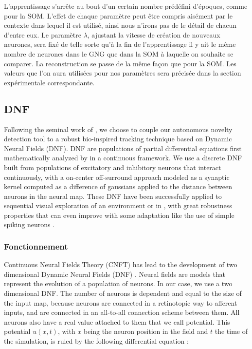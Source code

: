 	L'apprentissage s'arrête au bout d'un certain nombre prédéfini d'époques, comme pour la SOM. L'effet de chaque paramètre peut être compris aisément par le contexte dans lequel il est utilisé, ainsi nous n'irons pas de le détail de chacun d'entre eux. Le paramètre $\lambda$, ajustant la vitesse de création de nouveaux neurones, sera fixé de telle sorte qu'à la fin de l'apprentissage il y ait le même nombre de neurones dans le GNG que dans la SOM à laquelle on souhaite se comparer. La reconstruction se passe de la même façon que pour la SOM. Les valeurs que l'on aura utilisées pour nos paramètres sera précisée dans la section expérimentale correspondante.

	\subsection{DNF}

	

	Following the seminal work of \cite{Fix:dnf:2011}, we choose to couple our autonomous novelty detection tool to a robust bio-inspired tracking technique based on Dynamic Neural Fields (DNF). DNF are populations of partial differential equations first mathematically analyzed by \cite{amari:dnf:1977} in a continuous framework. We use a discrete DNF built from populations of excitatory and inhibitory neurons that interact continuously, with a on-center off-surround approach modeled as a synaptic kernel computed as a difference of gaussians applied to the distance between neurons in the neural map. These DNF have been successfully applied to sequential visual exploration of an environment \cite{Fix:dnf:2011} or in \cite{rougier:attention:2005}, with great robustness properties that can even improve with some adaptation like the use of simple spiking neurons \cite{vazquez:dnf:2011}. 

	\subsubsection{Fonctionnement}

	Continuous Neural Fields Theory (CNFT) has lead to the development of two dimensional Dynamic Neural Fields (DNF) \cite{Taylor2D}. Neural fields are models that represent the evolution of a population of neurons. In our case, we use a two dimensional DNF. The number of neurons is dependent and equal to the size of the input map, because neurons are connected in a retinotopic way to afferent inputs, and are connected in an all-to-all connection scheme between them. All neurons also have a real value attached to them that we call potential. This potential $u(x,t)$, with $x$ being the neuron position in the field and $t$ the time of the simulation, is ruled by the following differential equation :

